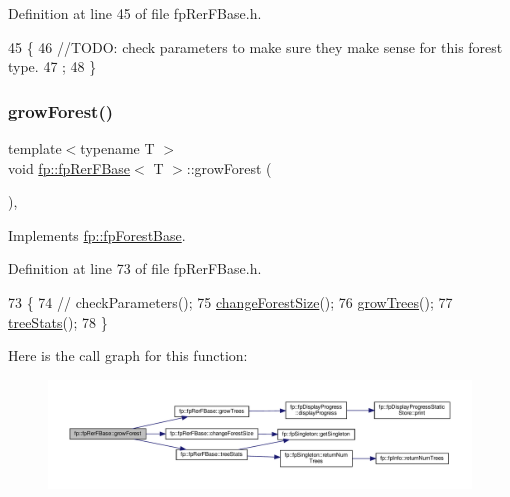 Definition at line 45 of file fp\+Rer\+F\+Base.\+h.


\begin{DoxyCode}
45                                          \{
46                 \textcolor{comment}{//TODO: check parameters to make sure they make sense for this forest type.}
47                 ;
48             \}
\end{DoxyCode}
\mbox{\label{classfp_1_1fpRerFBase_a0205440403a691b7644a6af0ef796d7a}} 
\subsubsection{\texorpdfstring{grow\+Forest()}{growForest()}}
{\footnotesize\ttfamily template$<$typename T $>$ \\
void \hyperlink{classfp_1_1fpRerFBase}{fp\+::fp\+Rer\+F\+Base}$<$ T $>$\+::grow\+Forest (\begin{DoxyParamCaption}{ }\end{DoxyParamCaption})\hspace{0.3cm}{\ttfamily [inline]}, {\ttfamily [virtual]}}



Implements \hyperlink{classfp_1_1fpForestBase_a05b1d924a559536083ee7a8cf3ea542d}{fp\+::fp\+Forest\+Base}.



Definition at line 73 of file fp\+Rer\+F\+Base.\+h.


\begin{DoxyCode}
73                              \{
74                 \textcolor{comment}{//  checkParameters();}
75                 \hyperlink{classfp_1_1fpRerFBase_a4aa9be48cadab132857ea9d9da18fe8a}{changeForestSize}();
76                 \hyperlink{classfp_1_1fpRerFBase_a5faf8bb9221d903880e0bd6660ea4d0d}{growTrees}();
77                 \hyperlink{classfp_1_1fpRerFBase_ad9983abf38c0cb799ed490129508d42e}{treeStats}();
78             \}
\end{DoxyCode}
Here is the call graph for this function\+:
\nopagebreak
\begin{figure}[H]
\begin{center}
\leavevmode
\includegraphics[width=350pt]{classfp_1_1fpRerFBase_a0205440403a691b7644a6af0ef796d7a_cgraph}
\end{center}
\end{figure}
\mbox{\label{classfp_1_1fpRerFBase_a5faf8bb9221d903880e0bd6660ea4d0d}} 
